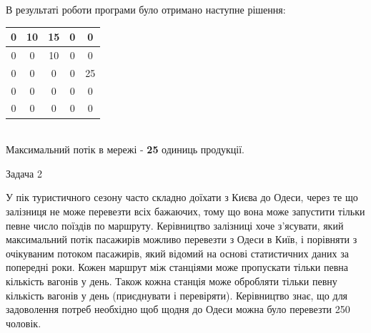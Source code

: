 \documentclass[a4paper,14pt,russian,ukrainian,oneside,final]{extreport}
\begin{document}
\indent В результаті роботи програми було отримано наступне рішення:
\begin{center}
\begin{tabular}{|c|c|c|c|c|}
\hline
0&10&15&0&0 \\
\hline
0&0&10&0&0 \\
\hline
0&0&0&0&25 \\
\hline
0&0&0&0&0\\
\hline
0&0&0&0&0 \\
\hline
\end{tabular} \\
Максимальний потік в мережі - {\bf 25} одиниць продукції.
\end{center}

Задача 2

\indent
У пік туристичного сезону часто складно доїхати з Києва до Одеси, через те що залізниця не може перевезти всіх бажаючих, тому що вона може запустити тільки певне число поїздів по маршруту. Керівництво залізниці хоче з'ясувати, який максимальний потік пасажирів можливо перевезти з Одеси в Київ, і порівняти з очікуваним потоком пасажирів, який відомий на основі статистичних даних за попередні роки.
Кожен маршрут між станціями може пропускати тільки певна кількість вагонів у день.
Також кожна станція може обробляти тільки певну кількість вагонів у день (приєднувати і перевіряти).
Керівництво знає, що для задоволення потреб необхідно щоб щодня до Одеси можна було перевезти 250 чоловік.
\end{document}
